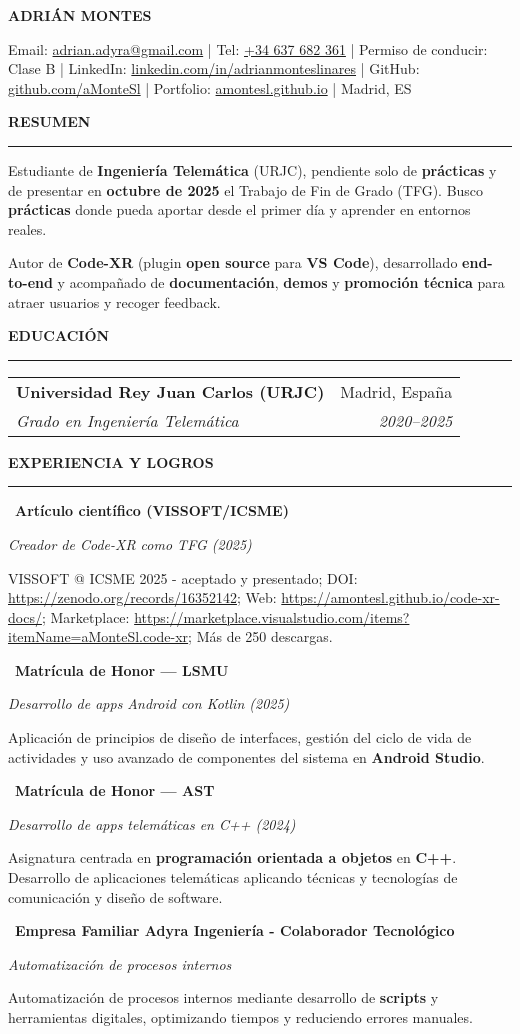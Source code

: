 \documentclass[10pt,a4paper]{article}
\makeatletter
\newcommand{\Name}[1]{%
	\begin{center}
		{\bfseries\fontsize{21}{23}\selectfont #1}\par
	\end{center}
}
\newcommand{\Contact}[1]{%
	\begin{center}
		\footnotesize #1
	\end{center}
}
\newcommand{\SectionTitle}[1]{%
	\vspace{5pt}%
	{\bfseries\MakeUppercase{#1}}\par
	\rule{\textwidth}{0.5pt}\vspace{3pt}%
}
\newcommand{\TightTwoCol}[4]{%
	\begingroup\setlength{\tabcolsep}{0pt}\renewcommand{\arraystretch}{0.95}%
	\noindent\begin{tabular*}{\textwidth}{@{}l@{\extracolsep{\fill}}r@{}}
		\textbf{#1} & #3 \\
		\textit{#2} & \textit{#4} \\
	\end{tabular*}\par\endgroup
}
\newcommand{\EduEntry}[4]{%
	\TightTwoCol{#1}{#2}{#3}{#4}\vspace{3pt}
}
\newcommand{\ProjEntry}[3]{%
	\noindent\textbullet\ \textbf{#1}\par
	\textit{#2}\par
	#3\par\vspace{3pt}%
}
\makeatother
\begin{document}
	
	\Name{ADRIÁN MONTES}
	
	\Contact{%
		Email: \href{mailto:adrian.adyra@gmail.com}{adrian.adyra@gmail.com} \enspace|\enspace
		Tel: \href{https://wa.me/34637682361}{+34 637 682 361} \enspace|\enspace
		Permiso de conducir: Clase B \enspace|\enspace
		LinkedIn: \href{https://linkedin.com/in/adrianmonteslinares}{linkedin.com/in/adrianmonteslinares} \enspace|\enspace
		GitHub: \href{https://github.com/aMonteSl}{github.com/aMonteSl} \enspace|\enspace
		Portfolio: \href{https://amontesl.github.io/}{amontesl.github.io} \enspace|\enspace
		Madrid, ES
	}
	
	\SectionTitle{Resumen}

	Estudiante de \textbf{Ingeniería Telemática} (URJC), pendiente solo de \textbf{prácticas} y de presentar en \textbf{octubre de 2025} el Trabajo de Fin de Grado (TFG). Busco \textbf{prácticas} donde pueda aportar desde el primer día y aprender en entornos reales.

	Autor de \textbf{Code\mbox{-}XR} (plugin \textbf{open source} para \textbf{VS Code}), desarrollado \textbf{end-to-end} y acompañado de \textbf{documentación}, \textbf{demos} y \textbf{promoción técnica} para atraer usuarios y recoger feedback.
	
	\SectionTitle{Educación}
	\EduEntry{Universidad Rey Juan Carlos (URJC)}{Grado en Ingeniería Telemática}{Madrid, España}{2020--2025}
	
	\SectionTitle{Experiencia y logros}
	\ProjEntry
	{Artículo científico (VISSOFT/ICSME)}
	{Creador de Code-XR como TFG (2025)}
	{VISSOFT @ ICSME 2025 - aceptado y presentado; DOI: \url{https://zenodo.org/records/16352142}; Web: \url{https://amontesl.github.io/code-xr-docs/}; Marketplace: \url{https://marketplace.visualstudio.com/items?itemName=aMonteSl.code-xr}; Más de 250 descargas.}
	\ProjEntry
	{Matrícula de Honor — LSMU}
	{Desarrollo de apps Android con Kotlin (2025)}
	{Aplicación de principios de diseño de interfaces, gestión del ciclo de vida de actividades y uso avanzado de
		componentes del sistema en \textbf{Android Studio}.}
	\ProjEntry
	{Matrícula de Honor — AST}
	{Desarrollo de apps telemáticas en C++ (2024)}
	{Asignatura centrada en \textbf{programación orientada a objetos} en \textbf{C++}. Desarrollo de aplicaciones telemáticas
		aplicando técnicas y tecnologías de comunicación y diseño de software.}

	\ProjEntry
	{Empresa Familiar Adyra Ingeniería - Colaborador Tecnológico}
	{Automatización de procesos internos}
	{Automatización de procesos internos mediante desarrollo de \textbf{scripts} y herramientas digitales, optimizando tiempos y reduciendo errores manuales.}
	
\end{document}
